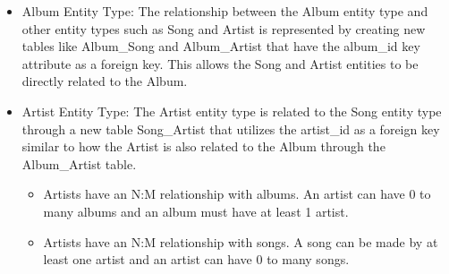 \documentclass[12pt]{article}
\begin{document}
    \begin{itemize}
        \item Album Entity Type: The relationship between the Album entity type and other entity types such as Song and Artist is represented by creating new tables like Album\_Song and Album\_Artist that have the album\_id key attribute as a foreign key. This allows the Song and Artist entities to be directly related to the Album.
        \item Artist Entity Type: The Artist entity type is related to the Song entity type through a new table Song\_Artist that utilizes the artist\_id as a foreign key similar to how the Artist is also related to the Album through the Album\_Artist table.
            \begin{itemize}
                \item Artists have an N:M relationship with albums. An artist can have 0 to many albums and an album must have at least 1 artist.
                \item Artists have an N:M relationship with songs. A song can be made by at least one artist and an artist can have 0 to many songs.


\end{itemize}
\end{itemize}
\end{document}
